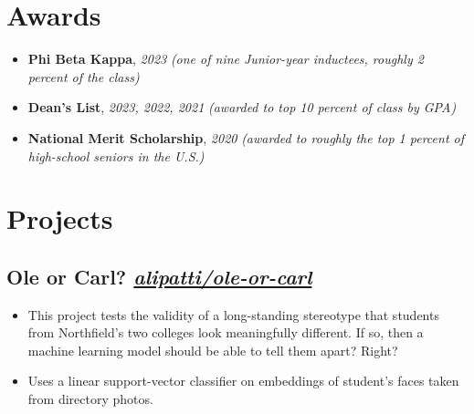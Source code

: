 \documentclass{resume}
\def\github{alipatti}
\begin{document}





\section{Awards}

\newcommand{\award}[2]{\textbf{#1}, \textit{#2}}

\begin{itemize}[label={}, leftmargin=0em]
	\item \award{Phi Beta Kappa}{2023}
	      \quad \textit{(one of nine Junior-year inductees, roughly 2 percent of the class)}
	\item \award{Dean's List}{2023, 2022, 2021}
	      \quad \textit{(awarded to top 10 percent of class by GPA)}
	\item \award{National Merit Scholarship}{2020}
	      \quad \textit{(awarded to roughly the top 1 percent of high-school seniors in the U.S.)}
\end{itemize}

\section{Projects}

\newcommand{\project}[2]{%
	\subsection{#1
		\hfill
		\normalfont \small \faicon{github}
		\href{https://github.com/\github/#2}{\textit{\github/#2}}
	}}

\project{Ole or Carl?}{ole-or-carl}

\begin{itemize}
	\item This project tests the validity of a long-standing stereotype that students from Northfield's two colleges look meaningfully different. If so, then a machine learning model should be able to tell them apart? Right?
	\item Uses a linear support-vector classifier on embeddings of student's faces taken from directory photos.
\end{itemize}
\end{document}
